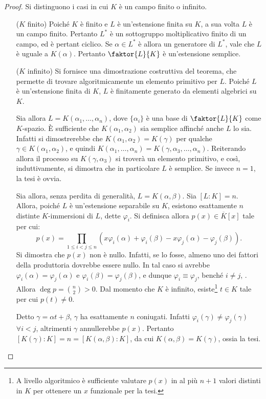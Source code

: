 \documentclass[12pt]{scrartcl}
\begin{document}
	\begin{proof}
		Si distinguono i casi in cui $K$ è un campo finito
		o infinito.
		
		\begin{itemize}
			\item[($K$ finito)\;] Poiché $K$ è finito e
			$L$ è un'estensione finita su $K$, a sua volta
			$L$ è un campo finito. Pertanto $L^*$ è un
			sottogruppo moltiplicativo finito di un campo, ed
			è pertant ciclico. Se $\alpha \in L^*$ è allora
			un generatore di $L^*$, vale che $L$ è uguale a
			$K(\alpha)$. Pertanto $\faktor{L}{K}$ è un'estensione
			semplice.

			\item[($K$ infinito)\;] 
			Si fornisce una dimostrazione costruttiva del
			teorema, che permette di trovare algoritmicamente
			un elemento primitivo per $L$.
			Poiché $L$ è un'estensione
			finita di $K$, $L$ è finitamente generato da
			elementi algebrici su $K$. \medskip
			
			
			Sia allora
			$L = K(\alpha_1, \ldots, \alpha_n)$, dove
			$\{ \alpha_i \}$ è una base di
			$\faktor{L}{K}$ come $K$-spazio. È sufficiente
			che $K(\alpha_1, \alpha_2)$ sia semplice affinché
			anche $L$ lo sia. Infatti
			si dimostrerebbe che $K(\alpha_1, \alpha_2) =
			K(\gamma)$ per qualche $\gamma \in K(\alpha_1, \alpha_2)$,
			e quindi $K(\alpha_1, \ldots, \alpha_n) =
			K(\gamma, \alpha_3, \ldots, \alpha_n)$. Reiterando
			allora il processo su $K(\gamma, \alpha_3)$ si
			troverà un elemento primitivo, e così, induttivamente,
			si dimostra che in particolare $L$ è semplice. Se
			invece $n = 1$, la tesi è ovvia. \medskip
			
			
			Sia allora, senza perdita di generalità, $L = K(\alpha, \beta)$. Sia $[L : K] = n$. Allora, poiché $L$
			è un'estensione separabile su $K$, esistono
			esattamente $n$ distinte $K$-immersioni di $L$,
			dette $\varphi_i$.
			Si definisca allora $p(x) \in \overline{K}[x]$ tale per cui:
			\[ p(x) = \prod_{1 \leq i < j \leq n} (x \varphi_i(\alpha) + \varphi_i(\beta) - x \varphi_j(\alpha) - \varphi_j(\beta)). \]
			Si dimostra che $p(x)$ non è nullo. Infatti,
			se lo fosse, almeno uno dei fattori della produttoria
			dovrebbe essere nullo. In tal caso si avrebbe
			$\varphi_i(\alpha) = \varphi_j(\alpha)$ e
			$\varphi_i(\beta) = \varphi_j(\beta)$, e dunque
			$\varphi_i \equiv \varphi_j$, benché $i \neq j$,
			\Lightning. Allora $\deg p = \binom{n}{2} > 0$.
			Dal momento che $K$ è infinito, esiste\footnote{
				A livello algoritmico è sufficiente valutare
				$p(x)$ in al più $n+1$ valori distinti in $K$
				per ottenere un $x$ funzionale per la tesi.
			} $t \in K$
			tale per cui $p(t) \neq 0$. \medskip
			
			
			Detto $\gamma = \alpha t + \beta$, $\gamma$
			ha esattamente $n$ coniugati. Infatti
			$\varphi_i(\gamma) \neq \varphi_j(\gamma)$ $\forall i < j$, altrimenti $\gamma$ annullerebbe $p(x)$. Pertanto
			$[K(\gamma) : K] = n = [K(\alpha, \beta) : K]$,
			da cui $K(\alpha, \beta) = K(\gamma)$, ossia la tesi.
		\end{itemize}
	\end{proof} \medskip
\end{document}
